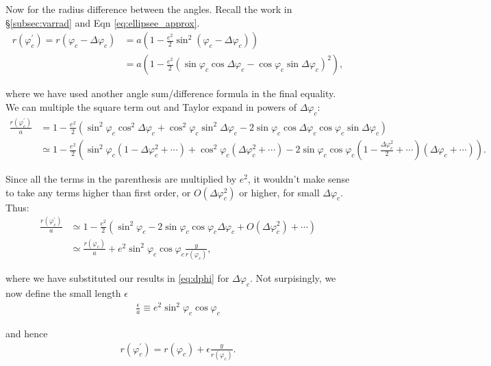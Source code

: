 \documentclass[10pt]{article}
\begin{document}
Now for the radius difference between the angles. Recall the work in \S\ref{subsec:varrad} and Eqn \eqref{eq:ellipsee_approx}.
\begin{align*}
r(\varphi_c^{'}) = r(\varphi_c - \Delta \varphi_c) &= a \left(1-\frac{e^2}{2} \sin^2 (\varphi_c - \Delta \varphi_c)\right) \\[0.4em]
&= a \left(1 - \frac{e^2}{2} (\sin \varphi_c \cos \Delta \varphi_c - \cos \varphi_c \sin \Delta \varphi_c)^2\right),
\end{align*}

where we have used another angle sum/difference formula in the final equality. We can multiple the square term out and Taylor expand in powers of $\Delta \varphi_c$:
\begin{align*}
\frac{r(\varphi_c^{'})}{a} &= 1 - \frac{e^2}{2}(\sin^2 \varphi_c \cos^2 \Delta \varphi_c + \cos^2 \varphi_c \sin^2 \Delta \varphi_c - 2\sin \varphi_c \cos \Delta \varphi_c \cos \varphi_c \sin \Delta \varphi_c) \\[0.4em]
&\simeq 1 - \frac{e^2}{2}\left(\sin^2 \varphi_c (1 - \Delta \varphi_c^2 +\cdots) + \cos^2 \varphi_c (\Delta \varphi_c^2 +\cdots) - 2\sin \varphi_c \cos \varphi_c \left(1 - \frac{\Delta \varphi_c^2}{2} +\cdots \right)  (\Delta \varphi_c +\cdots) \right).
\end{align*}

Since all the terms in the parenthesis are multiplied by $e^2$, it wouldn't make sense to take any terms higher than first order, or $O(\Delta \varphi_c^2)$ or higher, for small $\Delta \varphi_c$. Thus:
\begin{align}
\frac{r(\varphi_c^{'})}{a} &\simeq 1 - \frac{e^2}{2}(\sin^2 \varphi_c - 2\sin\varphi_c \cos\varphi_c \Delta\varphi_c + O(\Delta\varphi_c^2) +\cdots) \nonumber \\[0.4em]
&\simeq \frac{r(\varphi_c)}{a} + e^2 \sin^2\varphi_c \cos\varphi_c  \frac{y}{r(\varphi_c)},
\end{align}

where we have substituted our results in \eqref{eq:dphi} for $\Delta\varphi_c$. Not surpisingly, we now define the small length $\epsilon$
\begin{align}
\frac{\epsilon}{a} \equiv e^2 \sin^2\varphi_c \cos\varphi_c
\end{align}

and hence
\begin{align} \label{eq:rpert}
r(\varphi_c^{'}) = r(\varphi_c) + \epsilon \frac{y}{r(\varphi_c)}.
\end{align}
\end{document}
